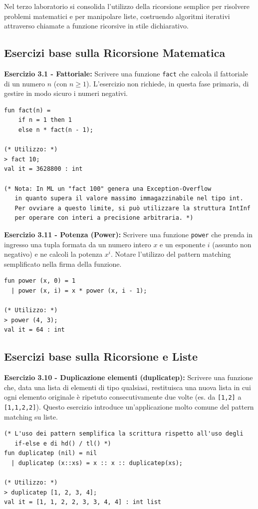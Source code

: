 \documentclass[12pt, a4paper]{article}
\begin{document}
Nel terzo laboratorio si consolida l'utilizzo della ricorsione semplice per risolvere problemi matematici e per manipolare liste, costruendo algoritmi iterativi attraverso chiamate a funzione ricorsive in stile dichiarativo.

\newpage

\subsection{Esercizi base sulla Ricorsione Matematica}

\textbf{Esercizio 3.1 - Fattoriale:}
Scrivere una funzione \texttt{fact} che calcola il fattoriale di un numero $n$ (con $n \ge 1$). L'esercizio non richiede, in questa fase primaria, di gestire in modo sicuro i numeri negativi.
\begin{verbatim}
fun fact(n) =
    if n = 1 then 1
    else n * fact(n - 1);

(* Utilizzo: *)
> fact 10;
val it = 3628800 : int

(* Nota: In ML un "fact 100" genera una Exception-Overflow 
   in quanto supera il valore massimo immagazzinabile nel tipo int.
   Per ovviare a questo limite, si può utilizzare la struttura IntInf 
   per operare con interi a precisione arbitraria. *)
\end{verbatim}

\textbf{Esercizio 3.11 - Potenza (Power):}
Scrivere una funzione \texttt{power} che prenda in ingresso una tupla formata da un numero intero $x$ e un esponente $i$ (assunto non negativo) e ne calcoli la potenza $x^i$. Notare l'utilizzo del pattern matching semplificato nella firma della funzione.
\begin{verbatim}
fun power (x, 0) = 1
  | power (x, i) = x * power (x, i - 1);

(* Utilizzo: *)
> power (4, 3);
val it = 64 : int
\end{verbatim}

\subsection{Esercizi base sulla Ricorsione e Liste}

\textbf{Esercizio 3.10 - Duplicazione elementi (duplicatep):}
Scrivere una funzione che, data una lista di elementi di tipo qualsiasi, restituisca una nuova lista in cui ogni elemento originale è ripetuto consecutivamente due volte (es. da \texttt{[1,2]} a \texttt{[1,1,2,2]}). Questo esercizio introduce un'applicazione molto comune del pattern matching su liste.
\begin{verbatim}
(* L'uso dei pattern semplifica la scrittura rispetto all'uso degli 
   if-else e di hd() / tl() *)
fun duplicatep (nil) = nil
  | duplicatep (x::xs) = x :: x :: duplicatep(xs);

(* Utilizzo: *)
> duplicatep [1, 2, 3, 4];
val it = [1, 1, 2, 2, 3, 3, 4, 4] : int list
\end{verbatim}
\end{document}
